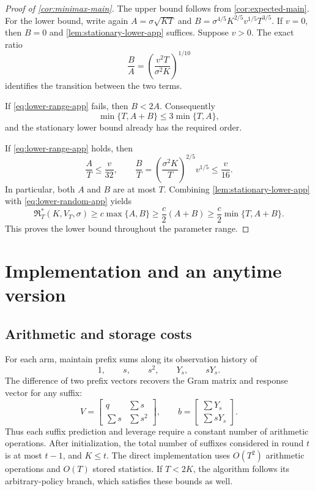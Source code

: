 \documentclass[11pt]{article}
\theoremstyle{remark}
\begin{document}
\begin{proof}[Proof of \cref{cor:minimax-main}]
The upper bound follows from \cref{cor:expected-main}.
For the lower bound, write again
$A=\sigma\sqrt{KT}$ and
$B=\sigma^{4/5}K^{2/5}v^{1/5}T^{3/5}$.
If $v=0$, then $B=0$ and \cref{lem:stationary-lower-app} suffices.
Suppose $v>0$.  The exact ratio
\begin{equation}\label{eq:regime-ratio-app}
\frac BA=\left(\frac{v^2T}{\sigma^2K}\right)^{1/10}
\end{equation}
identifies the transition between the two terms.

If \eqref{eq:lower-range-app} fails, then $B<2A$.
Consequently
\[
\min\{T,A+B\}\le3\min\{T,A\},
\]
and the stationary lower bound already has the required order.

If \eqref{eq:lower-range-app} holds, then
\[
\frac AT\le\frac v{32},
\qquad
\frac BT
=\left(\frac{\sigma^2K}T\right)^{2/5}v^{1/5}
\le\frac v{16}.
\]
In particular, both $A$ and $B$ are at most $T$.  Combining
\cref{lem:stationary-lower-app} with
\eqref{eq:lower-random-app} yields
\[
\mathfrak R_T^*(K,V_T,\sigma)
\ge c\max\{A,B\}
\ge\frac c2(A+B)
\ge\frac c2\min\{T,A+B\}.
\]
This proves the lower bound throughout the parameter range.
\end{proof}

\section{Implementation and an anytime version}\label{app:computation}

\subsection{Arithmetic and storage costs}

For each arm, maintain prefix sums along its observation history of
\[
1,\qquad s,\qquad s^2,\qquad Y_s,\qquad sY_s.
\]
The difference of two prefix vectors recovers the Gram matrix and
response vector for any suffix:
\[
V=
\begin{bmatrix}
q&\sum s\\
\sum s&\sum s^2
\end{bmatrix},
\qquad
b=
\begin{bmatrix}
\sum Y_s\\
\sum sY_s
\end{bmatrix}.
\]
Thus each suffix prediction and leverage require a constant number of
arithmetic operations.  After initialization, the total number of
suffixes considered in round $t$ is at most $t-1$, and $K\le t$.
The direct implementation uses $O(T^2)$ arithmetic operations and
$O(T)$ stored statistics.  If $T<2K$, the algorithm follows its
arbitrary-policy branch, which satisfies these bounds as well.
\end{document}
